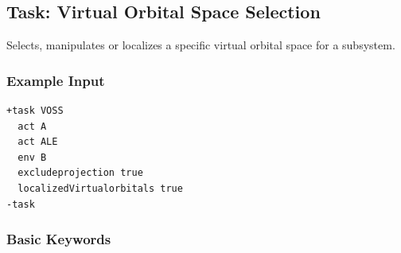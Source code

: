 \documentclass[bibliography=totocnumbered,a4paper,10pt,oneside]{scrbook}
\begin{document}
\subsection{Task: Virtual Orbital Space Selection}
\label{sec:VOSS}
Selects, manipulates or localizes a specific virtual orbital space for a subsystem.
\subsubsection{Example Input}
\begin{lstlisting}
+task VOSS
  act A
  act ALE
  env B
  excludeprojection true
  localizedVirtualorbitals true
-task
\end{lstlisting}
\subsubsection{Basic Keywords}
\end{document}
